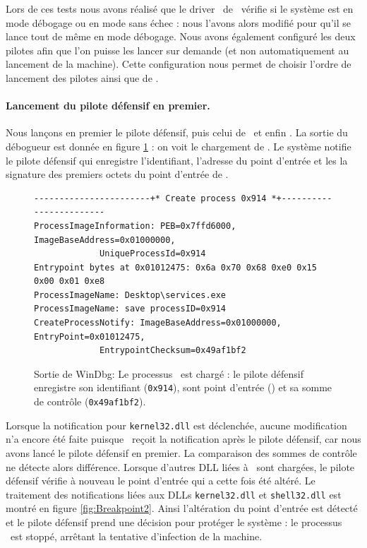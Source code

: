 Lors de ces tests nous avons réalisé que le driver \driver\ de \duqu\ vérifie si le système est en mode débogage ou en mode sans échec : nous l'avons alors modifié pour qu'il se lance tout de même en mode débogage.
Nous avons également configuré les deux pilotes afin que l'on puisse les lancer sur demande (et non automatiquement au lancement de la machine).
Cette configuration nous permet de choisir l'ordre de lancement des pilotes ainsi que de \services.

\paragraph{Lancement du pilote défensif en premier.}
Nous lançons en premier le pilote défensif, puis celui de \duqu\ et enfin \services.
La sortie du débogueur est donnée en figure \ref{fig:Breakpoint1} : on voit le chargement de \services.
Le système notifie le pilote défensif qui enregistre l'identifiant, l'adresse du point d'entrée et les la signature des premiers octets du point d'entrée de \services.

\begin{figure}[h]
\begin{center}
\scriptsize
\begin{lstlisting}[language={}]
-----------------------+* Create process 0x914 *+------------------------
ProcessImageInformation: PEB=0x7ffd6000, ImageBaseAddress=0x01000000,
			 UniqueProcessId=0x914 
Entrypoint bytes at 0x01012475: 0x6a 0x70 0x68 0xe0 0x15 0x00 0x01 0xe8
ProcessImageName: Desktop\services.exe
ProcessImageName: save processID=0x914
CreateProcessNotify: ImageBaseAddress=0x01000000, EntryPoint=0x01012475,
		     EntrypointChecksum=0x49af1bf2
\end{lstlisting}
\end{center}
\caption{Sortie de WinDbg: Le processus \services\ est chargé : le pilote défensif enregistre son identifiant (\texttt{0x914}), sont point d'entrée () et sa somme de contrôle (\texttt{0x49af1bf2}).\label{fig:Breakpoint1}}
\end{figure}

Lorsque la notification pour \texttt{kernel32.dll} est déclenchée, aucune modification n'a encore été faite puisque \duqu\ reçoit la notification après le pilote défensif, car nous avons lancé le pilote défensif en premier.
La comparaison des sommes de contrôle ne détecte alors différence.
Lorsque d'autres DLL liées à \services\ sont chargées, le pilote défensif vérifie à nouveau le point d'entrée qui a cette fois été altéré.
Le traitement des notifications liées aux DLLs \texttt{kernel32.dll} et \texttt{shell32.dll} est montré en figure \ref{fig:Breakpoint2}.
Ainsi l'altération du point d'entrée est détecté et le pilote défensif prend une décision pour protéger le système : le processus \services\ est stoppé, arrêtant la tentative d'infection de la machine.



